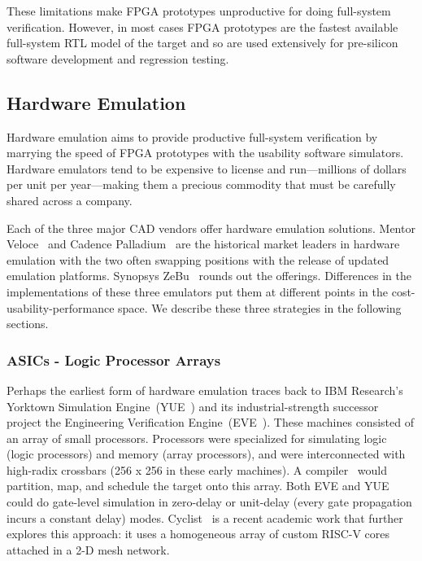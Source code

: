 These limitations make FPGA prototypes unproductive for doing full-system
verification. However, in most cases FPGA prototypes are the fastest available
full-system RTL model of the target and so are used extensively for
pre-silicon software development and regression testing.

\subsection{Hardware Emulation}

Hardware emulation aims to provide productive full-system verification by
marrying the speed of FPGA prototypes with the usability software simulators.
Hardware emulators tend to be expensive to license and run---millions of
dollars per unit per year---making them a precious commodity that must be carefully
shared across a company.

Each of the three major CAD vendors offer hardware emulation solutions.
Mentor Veloce~\cite{Veloce} and Cadence Palladium~\cite{Palladium} are the historical market leaders in
hardware emulation with the two often swapping positions with the release of updated
emulation platforms. Synopsys ZeBu~\cite{ZeBu} rounds out the offerings.
Differences in the implementations of these three emulators put them at
different points in the cost-usability-performance space. We describe these three strategies in the following sections.

\subsubsection{ASICs - Logic Processor Arrays}

Perhaps the earliest form of hardware emulation traces back to IBM Research's
Yorktown Simulation Engine~(YUE~\cite{YSEHardware}) and its industrial-strength successor project
the Engineering Verification Engine~(EVE~\cite{EngineeringVerificationEngine}). These machines consisted of an array
of small processors. Processors were
specialized for simulating logic (logic processors) and memory (array
processors), and were interconnected with high-radix crossbars (256 x 256 in
these early machines). A compiler~\cite{YSESoftware} would partition, map, and schedule
the target onto this array. Both EVE and YUE could do gate-level simulation in zero-delay
or unit-delay (every gate propagation incurs a constant delay) modes. Cyclist~\cite{Cyclist}
is a recent academic work that further explores this approach: it uses a
homogeneous array of custom RISC-V cores attached in a 2-D mesh network.

